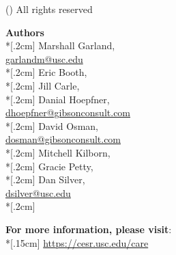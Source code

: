 \cleardoublepage
\pagecolor{gray!33!}
\twocolumn
\thispagestyle{empty}
\vspace*{3in}
{\large  (\the\year) All rights reserved}
\vspace*{6cm}
\newpage

\noindent\textbf{Authors} \\*[.2cm]
Marshall Garland, \\
\href{mailto:garlandm@usc.edu}{garlandm@usc.edu} \\*[.2cm]
Eric Booth, \\*[.2cm]
Jill Carle, \\*[.2cm]
Danial Hoepfner, \\
\href{mailto:dhoepfner@gibsonconsult.com}{dhoepfner@gibsonconsult.com} \\*[.2cm]
David Osman, \\
\href{mailto:dosman@gibsonconsult.com}{dosman@gibsonconsult.com} \\*[.2cm]
Mitchell Kilborn, \\*[.2cm]
Gracie Petty, \\*[.2cm]
Dan Silver, \\
\href{mailto:dsilver@usc.edu}{dsilver@usc.edu} \\*[.2cm]


\begin{center}
\noindent\textbf{For more information, please visit}: \\*[.15cm]
\href{https://cesr.usc.edu/care}{https://cesr.usc.edu/care}

\vspace*{.4cm}

\end{center}
\cleardoublepage
\onecolumn
